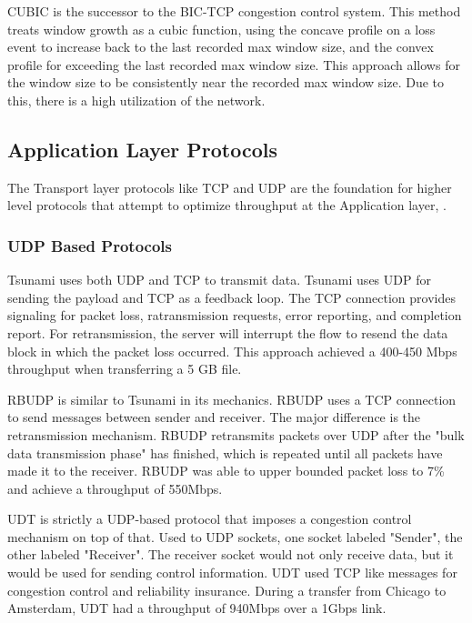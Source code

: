 CUBIC \cite{ha2008cubic} is the successor to the BIC-TCP congestion control system. This method treats window growth as a cubic function, using the concave profile on a loss event to increase back to the last recorded max window size, and the convex profile for exceeding the last recorded max window size. This approach allows for the window size to be consistently near the recorded max window size. Due to this, there is a high utilization of the network.

\subsection{Application Layer Protocols}

The Transport layer protocols like TCP and UDP are the foundation for higher level protocols that attempt to optimize throughput at the Application layer, \cite{Fan2010}\cite{Allman1997}\cite{Allman1995}\cite{Aspera2016}\cite{Meiss2007}\cite{gu2007udt}\cite{lai2009designing}\cite{He2002}\cite{Sivakumar2000psockets}.

\subsubsection{UDP Based Protocols}

Tsunami \cite{Meiss2007} uses both UDP and TCP to transmit data. Tsunami uses UDP for sending the payload and TCP as a feedback loop. The TCP connection provides signaling for packet loss, ratransmission requests, error reporting, and completion report. For retransmission, the server will interrupt the flow to resend the data block in which the packet loss occurred. This approach achieved a 400-450 Mbps throughput when transferring a 5 GB file.

RBUDP \cite{He2002} is similar to Tsunami in its mechanics. RBUDP uses a TCP connection to send messages between sender and receiver. The major difference is the retransmission mechanism. RBUDP retransmits packets over UDP after the "bulk data transmission phase" has finished, which is repeated until all packets have made it to the receiver. RBUDP was able to upper bounded packet loss to 7\% and achieve a throughput of 550Mbps.

UDT \cite{gu2007udt} is strictly a UDP-based protocol that imposes a congestion control mechanism on top of that. Used to UDP sockets, one socket labeled "Sender", the other labeled "Receiver". The receiver socket would not only receive data, but it would be used for sending control information. UDT used TCP like messages for congestion control and reliability insurance. During a transfer from Chicago to Amsterdam, UDT had a throughput of 940Mbps over a 1Gbps link.

